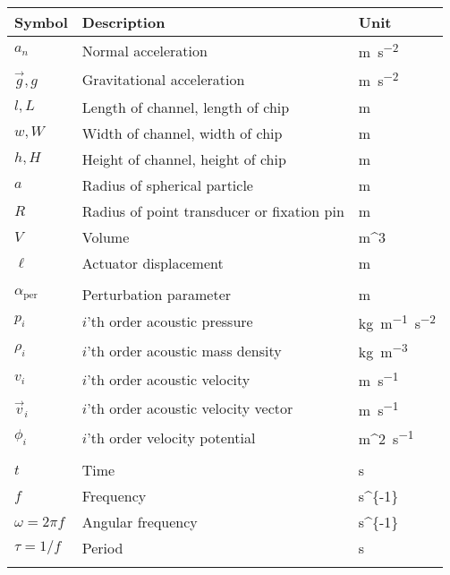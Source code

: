 \begin{center}
\begin{tabular}{p{2cm}p{8cm}p{3cm}}
Symbol						& Description             						& Unit \\ \hline\hline
$a_n$		   	  			& Normal acceleration							& \SI{m}{s^{-2}} \\
$\vec{g},g$		   	  		& Gravitational acceleration					& \SI{m}{s^{-2}} \\
$l,L$		 				& Length of channel, length of chip				& \SI{m}{} \\
$w,W$		 				& Width of channel, width of chip				& \SI{m}{} \\
$h,H$		 				& Height of channel, height of chip				& \SI{m}{} \\
$a$		 					& Radius of spherical particle					& \SI{m}{} \\
$R$		 					& Radius of point transducer or fixation pin	& \SI{m}{} \\
$V$		 					& Volume										& \SI{m^3}{} \\
$\ell$		           		& Actuator displacement							& \SI{m}{} \\\\

$\alpha_\mathrm{per}$		& Perturbation parameter				    	& \SI{m}{} \\
$p_i$                     	& $i$'th order acoustic pressure				& \SI{kg}{m^{-1}s^{-2}} \\
$\rho_i$                  	& $i$'th order acoustic mass density  			& \SI{kg}{m^{-3}} \\
$v_i$				      	& $i$'th order acoustic velocity				& \SI{m}{s^{-1}} \\
$\vec{v}_i$		          	& $i$'th order acoustic velocity vector 		& \SI{m}{s^{-1}} \\
$\phi_i$				  	& $i$'th order velocity potential				& \SI{m^2}{s^{-1}} \\\\

$t$			           	  	& Time											& \SI{s}{} \\
$f$			           	  	& Frequency										& \SI{s^{-1}}{} \\
$\omega=2\pi f$			    & Angular frequency								& \SI{s^{-1}}{} \\
$\tau=1/f$			    	& Period										& \SI{s}{} \\\\


\end{tabular}
\end{center}
